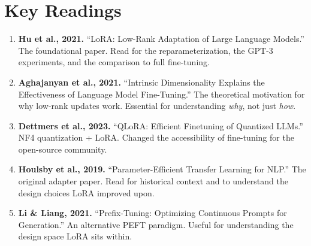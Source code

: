 \section*{Key Readings}

\begin{enumerate}[nosep]
  \item \textbf{Hu et al., 2021.} ``LoRA: Low-Rank Adaptation of Large Language Models.'' The foundational paper. Read for the reparameterization, the GPT-3 experiments, and the comparison to full fine-tuning.
  \item \textbf{Aghajanyan et al., 2021.} ``Intrinsic Dimensionality Explains the Effectiveness of Language Model Fine-Tuning.'' The theoretical motivation for why low-rank updates work. Essential for understanding \emph{why}, not just \emph{how}.
  \item \textbf{Dettmers et al., 2023.} ``QLoRA: Efficient Finetuning of Quantized LLMs.'' NF4 quantization + LoRA. Changed the accessibility of fine-tuning for the open-source community.
  \item \textbf{Houlsby et al., 2019.} ``Parameter-Efficient Transfer Learning for NLP.'' The original adapter paper. Read for historical context and to understand the design choices LoRA improved upon.
  \item \textbf{Li \& Liang, 2021.} ``Prefix-Tuning: Optimizing Continuous Prompts for Generation.'' An alternative PEFT paradigm. Useful for understanding the design space LoRA sits within.
\end{enumerate}

\flushbottom

